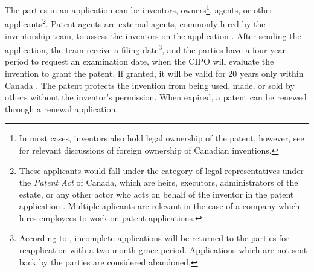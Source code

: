 \documentclass[../main.tex]{subfiles}
\begin{document}
The parties in an application can be inventors, owners\footnote{In most cases, inventors also hold legal ownership of the patent, however, see \textcite{alam_etal22, beaudry_schiffauerova11} for relevant discussions of foreign ownership of Canadian inventions.}, agents, or other applicants\footnote{These applicants would fall under the category of legal representatives under the \textit{Patent Act} of Canada, which are heirs, executors, administrators of the estate, or any other actor who acts on behalf of the inventor in the patent application \parencite{Patent85}. Multiple aplicants are relevant in the case of a company which hires employees to work on patent applications.}. Patent agents are external agents, commonly hired by the inventorship team, to assess the inventors on the application \parencite{putnam06}. After sending the application, the team receive a filing date\footnote{According to \textcite{canadianintellectualpropertyoffice21}, incomplete applications will be returned to the parties for reapplication with a two-month grace period. Applications which are not sent back by the parties are considered abandoned.}, and the parties have a four-year period to request an examination date, when the CIPO will evaluate the invention to grant the patent. If granted, it will be valid for 20 years only within Canada \parencite{abbes_etal22}. The patent protects the invention from being used, made, or sold by others without the inventor's permission. When expired, a patent can be renewed through a renewal application. 




\end{document}
